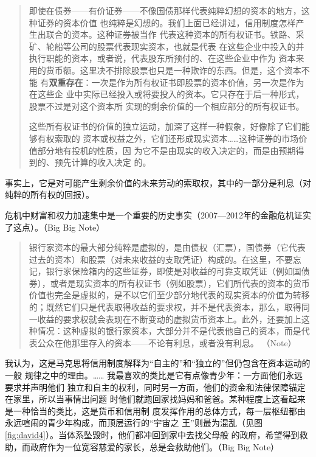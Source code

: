 \begin{quotation}
  即使在债券——有价证券——不像国债那样代表纯粹幻想的资本的地方，这种证券的资本价值
  也纯粹是幻想的。我们上面已经讲过，信用制度怎样产生出联合的资本。这种证券被当作
  代表这种资本的所有权证书。铁路、采矿、轮船等公司的股票代表现实资本，也就是代表
  在这些企业中投入的并执行职能的资本，或者说，代表股东所预付的、在这些企业中作为
  资本来用的货币额。这里决不排除股票也只是一种欺诈的东西。但是，这个资本不能
  有\textbf{双重存在}：一次是作为所有权证书即股票的资本价值，另一次是作为在这些企
  业中实际已经投入或将要投入的资本。它只存在于后一种形式，股票不过是对这个资本所
  实现的剩余价值的一个相应部分的所有权证书。

  这些所有权证书的价值的独立运动，加深了这样一种假象，好像除了它们能够有权索取的
  资本或权益之外，它们还形成现实资本……这种证券的市场价值部分地有投机的性质，因
  为它不是由现实的收入决定的，而是由预期得到的、预先计算的收入决定
  的。 

\end{quotation}
事实上，它是对可能产生剩余价值的未来劳动的索取权，其中的一部分是利息（对纯粹的所有权的回报）。

危机中财富和权力加速集中是一个重要的历史事实（2007—2012年的金融危机证实了这点）。（Big Big Note）

\begin{quotation}
银行家资本的最大部分纯粹是虚拟的，是由债权（汇票），国债券（它代表过去的资本）和股票（对未来收益的支取凭证）构成的。在这里，不要忘记，银行家保险箱内的这些证券，即使是对收益的可靠支取凭证（例如国债券），或者是现实资本的所有权证书（例如股票），它们所代表的资本的货币价值也完全是虚拟的，是不以它们至少部分地代表的现实资本的价值为转移的；既然它们只是代表取得收益的要求权，并不是代表资本，那么，取得同一收益的要求权就会表现在不断变动的虚拟货币资本上。此外，还要加上这种情况：这种虚拟的银行家资本，大部分并不是代表他自己的资本，而是代表公众在他那里存入的资本——不论有利息，或者没有利息。 （Note）

\end{quotation}


我认为，这是马克思将信用制度解释为“自主的”和“独立的”但仍包含在资本运动的一般
规律之中的理由。…… 我最喜欢的类比是它有点像青少年：一方面他们永远要求并声明他们
独立和自主的权利，同时另一方面，他们的资金和法律保障锚定在家里，所以当事情出问题
时他们就跑回家找妈妈和爸爸。某种程度上这看起来是一种恰当的类比，这是货币和信用制
度发挥作用的总体方式，每一层枢纽都由永远喧闹的青少年构成，而顶层运行的“宇宙之
王”则最为混乱（见图\ref{fig:david4}）。当体系坠毁时，他们都冲回到家中去找父母般
的政府，希望得到救助，而政府作为一位宽容慈爱的家长，总是会救助他们。（Big Big
Note）

